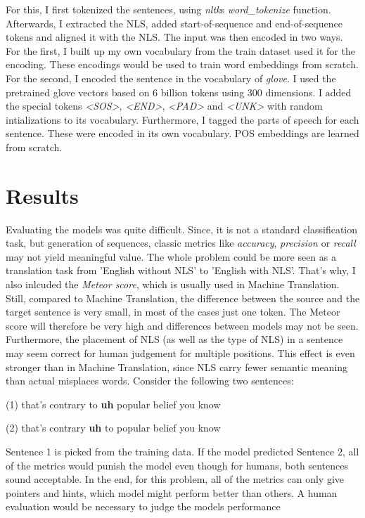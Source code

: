 \documentclass[
	11pt, %
]{fphw}
\begin{document}
For this, I first tokenized the sentences, using \emph{nltk}s \emph{word\_tokenize} function. Afterwards, I extracted the NLS, added start-of-sequence and end-of-sequence tokens and aligned it with the NLS. The input was then encoded in two ways. For the first, I built up my own vocabulary from the train dataset used it for the encoding. These encodings would be used to train word embeddings from scratch. For the second, I encoded the sentence in the vocabulary of \emph{glove}. I used the pretrained glove vectors based on 6 billion tokens using 300 dimensions. I added the special tokens \emph{<SOS>}, \emph{<END>}, \emph{<PAD>} and \emph{<UNK>} with random intializations to its vocabulary.
Furthermore, I tagged the parts of speech for each sentence. These were encoded in its own vocabulary. POS embeddings are learned from scratch.

\section*{Results}
Evaluating the models was quite difficult. Since, it is not a standard classification task, but generation of sequences, classic metrics like \emph{accuracy}, \emph{precision} or \emph{recall} may not yield meaningful value. The whole problem could be more seen as a translation task from 'English without NLS' to 'English with NLS'. That's why, I also inlcuded the \emph{Meteor score}, which is usually used in Machine Translation. Still, compared to Machine Translation, the difference between the source and the target sentence is very small, in most of the cases just one token. The Meteor score will therefore be very high and differences between models may not be seen. Furthermore, the placement of NLS (as well as the type of NLS) in a sentence may seem correct for human judgement for multiple positions. This effect is even stronger than in Machine Translation, since NLS carry fewer semantic meaning than actual misplaces words. Consider the following two sentences:
\begin{center}
    (1) that's contrary to \textbf{uh} popular belief you know
\end{center}
\begin{center}
    (2) that's contrary \textbf{uh} to popular belief you know
\end{center}
Sentence 1 is picked from the training data. If the model predicted Sentence 2, all of the metrics would punish the model even though for humans, both sentences sound acceptable. In the end, for this problem, all of the metrics can only give pointers and hints, which model might perform better than others. A human evaluation would be necessary to judge the models performance 
\end{document}
